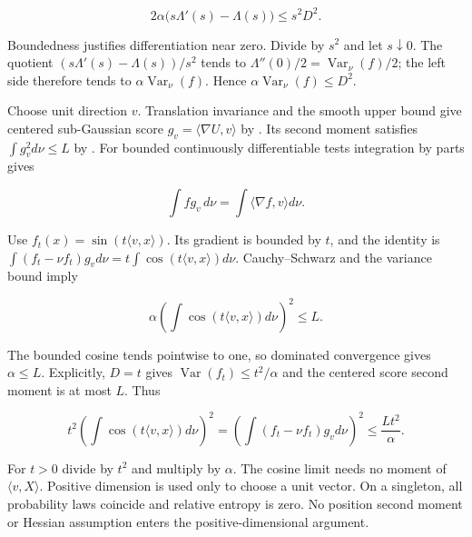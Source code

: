 \documentclass[11pt,a4paper]{report}
\begin{document}
\[2\alpha\bigl(s\Lambda'(s)-\Lambda(s)\bigr)\le s^2D^2.\]

Boundedness justifies differentiation near zero. Divide by \(s^2\) and let \(s\downarrow0\). The quotient \((s\Lambda'(s)-\Lambda(s))/s^2\) tends to \(\Lambda''(0)/2=\operatorname{Var}_\nu(f)/2\); the left side therefore tends to \(\alpha\operatorname{Var}_\nu(f)\). Hence \(\alpha\operatorname{Var}_\nu(f)\le D^2\).



Choose unit direction \(v\). Translation invariance and the smooth upper bound \cite[Section~3.9.1]{LangevinLean2026ULASC} give centered sub-Gaussian score \(g_v=\langle\nabla U,v\rangle\) by \cite[Section~3.27.3]{LangevinLean2026ULASC}. Its second moment satisfies \(\int g_v^2d\nu\le L\) by \cite[Section~3.27.5]{LangevinLean2026ULASC}. For bounded continuously differentiable tests integration by parts gives

\[\int f g_v\,d\nu=\int\langle\nabla f,v\rangle d\nu.\]

Use \(f_t(x)=\sin(t\langle v,x\rangle)\). Its gradient is bounded by \(t\), and the identity is \(\int(f_t-\nu f_t)g_vd\nu=t\int\cos(t\langle v,x\rangle)d\nu\). Cauchy–Schwarz and the variance bound imply

\[\alpha\left(\int\cos(t\langle v,x\rangle)d\nu\right)^2\le L.\]

The bounded cosine tends pointwise to one, so dominated convergence gives \(\alpha\le L\). Explicitly, \(D=t\) gives \(\operatorname{Var}(f_t)\le t^2/\alpha\) and the centered score second moment is at most \(L\). Thus

\[t^2\left(\int\cos(t\langle v,x\rangle)d\nu\right)^2
=\left(\int(f_t-\nu f_t)g_vd\nu\right)^2
\le\frac{Lt^2}{\alpha}.\]

For \(t>0\) divide by \(t^2\) and multiply by \(\alpha\). The cosine limit needs no moment of \(\langle v,X\rangle\). Positive dimension is used only to choose a unit vector. On a singleton, all probability laws coincide and relative entropy is zero. No position second moment or Hessian assumption enters the positive-dimensional argument.
\end{document}
